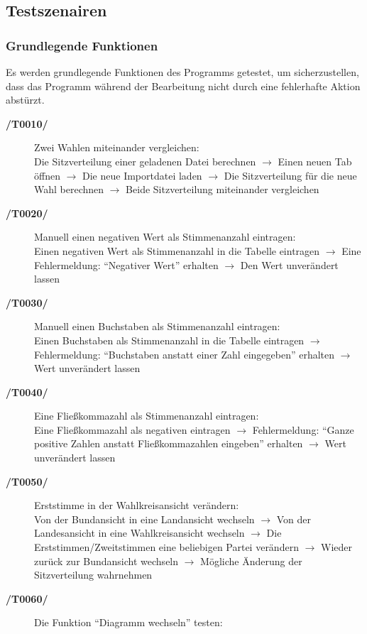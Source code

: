 \documentclass[10pt,a4paper]{article}
\begin{document}
\subsection{Testszenairen}
\subsubsection{Grundlegende Funktionen}
Es werden grundlegende Funktionen des Programms getestet, um sicherzustellen, dass das Programm während der Bearbeitung nicht durch eine fehlerhafte Aktion abstürzt.
\begin{description}
	\item[\textbf{/T0010/}] Zwei Wahlen miteinander vergleichen: \\
	Die Sitzverteilung einer geladenen Datei berechnen $\rightarrow$ Einen neuen Tab öffnen $\rightarrow$ Die neue Importdatei laden $\rightarrow$ Die Sitzverteilung für die neue Wahl berechnen $\rightarrow$ Beide Sitzverteilung miteinander vergleichen
	\item[\textbf{/T0020/}] Manuell einen negativen Wert als Stimmenanzahl eintragen: \\
	Einen negativen Wert als Stimmenanzahl in die Tabelle eintragen $\rightarrow$ Eine Fehlermeldung: ``Negativer Wert'' erhalten $\rightarrow$ Den Wert unverändert lassen
	\item[\textbf{/T0030/}] Manuell einen Buchstaben als Stimmenanzahl eintragen: \\
	Einen Buchstaben als Stimmenanzahl in die Tabelle eintragen $\rightarrow$ Fehlermeldung: ``Buchstaben anstatt einer Zahl eingegeben'' erhalten $\rightarrow$ Wert unverändert lassen \\
	\item[\textbf{/T0040/}] Eine Fließkommazahl als Stimmenanzahl eintragen: \\
	Eine Fließkommazahl als negativen eintragen $\rightarrow$ Fehlermeldung: ``Ganze positive Zahlen anstatt Fließkommazahlen eingeben'' erhalten $\rightarrow$ Wert unverändert lassen \\ 
	\item[\textbf{/T0050/}] Erststimme in der Wahlkreisansicht verändern: \\
	Von der Bundansicht in eine Landansicht wechseln $\rightarrow$ Von der Landesansicht in eine Wahlkreisansicht wechseln $\rightarrow$ Die Erststimmen/Zweitstimmen eine beliebigen Partei verändern $\rightarrow$ Wieder zurück zur Bundansicht wechseln $\rightarrow$ Mögliche Änderung der Sitzverteilung wahrnehmen
	\item[\textbf{/T0060/}] Die Funktion ``Diagramm wechseln'' testen:\\

\end{description}
\end{document}

